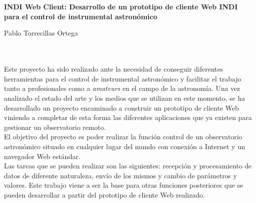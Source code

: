 \chapter*{}






\cleardoublepage
\thispagestyle{empty}

\begin{center}
{\large\bfseries INDI Web Client: Desarrollo de un prototipo de cliente Web INDI para el control de instrumental astronómico}\\
\end{center}
\begin{center}
Pablo Torrecillas Ortega\\
\end{center}

\\

\vspace{0.7cm}
\\

Este proyecto ha sido realizado ante la necesidad de conseguir diferentes herramientas para el control de instrumental astronómico y facilitar el trabajo tanto a profesionales como a \textit{amateurs} en el campo de la astronomía. Una vez analizado el estado del arte y los medios que se utilizan en este momento, se ha desarrollado un proyecto encaminado a construir un prototipo de cliente Web viniendo a completar de esta forma las diferentes aplicaciones que ya existen para gestionar un observatorio remoto.\\

El objetivo del proyecto es poder realizar la función control de un observatorio astronómico situado en cualquier lugar del mundo con conexión a Internet y un navegador Web estándar.\\

Las tareas que se pueden realizar son las siguientes: recepción y procesamiento de datos de diferente naturaleza, envío de los mismos y cambio de parámetros y valores. Este trabajo viene a ser la base para otras funciones posteriores que se pueden desarrollar a partir del prototipo de cliente Web realizado.\\

